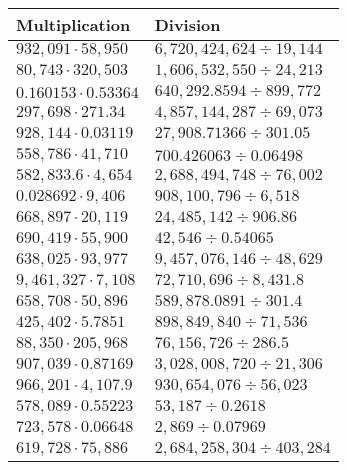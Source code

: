 \begin{longtable}[]{@{}ll@{}}
\toprule
Multiplication & Division\tabularnewline
\midrule
\endhead
\(932,091\cdot58,950\) & \(6,720,424,624÷19,144\)\tabularnewline
\(80,743\cdot320,503\) & \(1,606,532,550 ÷24,213\)\tabularnewline
\(0.160153\cdot0.53364\) & \(640,292.8594÷899,772\)\tabularnewline
\(297,698\cdot271.34\) & \(4,857,144,287÷69,073\)\tabularnewline
\(928,144\cdot0.03119\) & \(27,908.71366÷301.05\)\tabularnewline
\(558,786\cdot41,710\) & \(700.426063÷0.06498\)\tabularnewline
\(582,833.6\cdot4,654\) & \(2,688,494,748÷76,002\)\tabularnewline
\(0.028692\cdot9,406\) & \(908,100,796÷6,518\)\tabularnewline
\(668,897\cdot20,119\) & \(24,485,142÷906.86\)\tabularnewline
\(690,419\cdot55,900\) & \(42,546÷0.54065\)\tabularnewline
\(638,025\cdot93,977\) & \(9,457,076,146÷48,629\)\tabularnewline
\(9,461,327\cdot7,108\) & \(72,710,696÷8,431.8\)\tabularnewline
\(658,708\cdot50,896\) & \(589,878.0891÷301.4\)\tabularnewline
\(425,402\cdot5.7851\) & \(898,849,840÷71,536\)\tabularnewline
\(88,350\cdot205,968\) & \(76,156,726÷286.5\)\tabularnewline
\(907,039\cdot0.87169\) & \(3,028,008,720÷21,306\)\tabularnewline
\(966,201\cdot4,107.9\) & \(930,654,076÷56,023\)\tabularnewline
\(578,089\cdot0.55223\) & \(53,187÷0.2618\)\tabularnewline
\(723,578\cdot0.06648\) & \(2,869÷0.07969\)\tabularnewline
\(619,728\cdot75,886\) & \(2,684,258,304÷403,284\)\tabularnewline
\bottomrule
\end{longtable}
